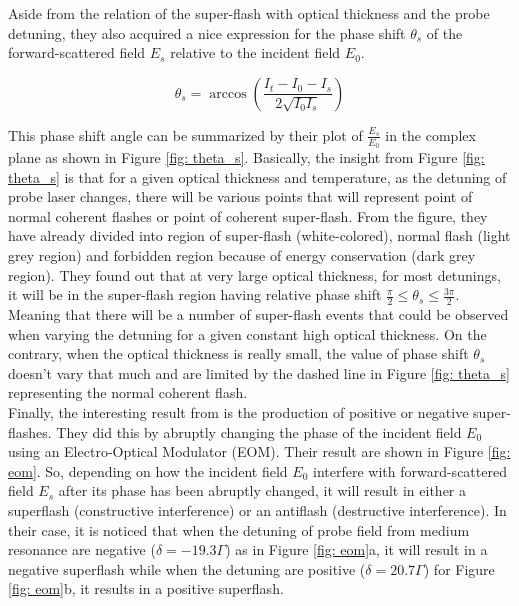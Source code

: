 Aside from the relation of the super-flash with optical thickness and the probe detuning, they also acquired a nice expression for the phase shift $\theta_{s}$ of the forward-scattered field $E_{s}$ relative to the incident field $E_{0}$. 

\begin{equation}
    \theta_{s} = \arccos({\frac{I_{t} - I_{0} - I_{s}}{2 \sqrt{I_{0} I_{s}}}})
\end{equation}

This phase shift angle can be summarized by their plot of $\frac{E_{s}}{E_{0}}$ in the complex plane as shown in Figure \ref{fig: theta_s}. Basically, the insight from Figure \ref{fig: theta_s} is that for a given optical thickness and temperature, as the detuning of probe laser changes, there will be various points that will represent point of normal coherent flashes or point of coherent super-flash. From the figure, they have already divided into region of super-flash (white-colored), normal flash (light grey region) and forbidden region because of energy conservation (dark grey region). They found out that at very large optical thickness, for most detunings, it will be in the super-flash region having relative phase shift $\frac{\pi}{2} \leq \theta_{s} \leq \frac{3\pi}{2}$. Meaning that there will be a number of super-flash events that could be observed when varying the detuning for a given constant high optical thickness. On the contrary, when the optical thickness is really small, the value of phase shift $\theta_{s}$ doesn't vary that much and are limited by the dashed line in Figure \ref{fig: theta_s} representing the normal coherent flash.\\

Finally,  the interesting result from \cite{Kwong2014} is the production of positive or negative super-flashes. They did this by abruptly changing the phase of the incident field $E_{0}$ using an Electro-Optical Modulator (EOM). Their result are shown in Figure \ref{fig: eom}. So, depending on how the incident field $E_{0}$ interfere with forward-scattered field $E_{s}$ after its phase has been abruptly changed, it will result in either a superflash (constructive interference) or an antiflash (destructive interference). In their case, it is noticed that when the detuning of probe field from medium resonance are negative ($\delta = -19.3 \Gamma$) as in Figure \ref{fig: eom}a, it will result in a negative superflash while when the detuning are positive ($\delta = 20.7 \Gamma$) for Figure \ref{fig: eom}b, it results in a positive superflash.

